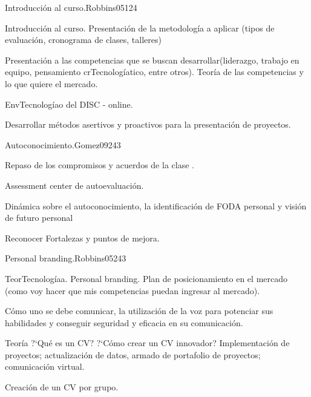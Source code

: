 \begin{syllabus}
\begin{unit}{Introducción al curso.}{}{Robbins05}{12}{4}
   \begin{topics}
      \item Introducción al curso. Presentación de la metodología a aplicar (tipos de evaluación, cronograma de clases, talleres)
      \item Presentación a las competencias que se buscan desarrollar(liderazgo, trabajo en equipo, pensamiento crTecnologíatico, entre otros). Teoría de las competencias y lo que quiere el mercado.
      \item EnvTecnologíao del DISC - online.
   \end{topics}
   \begin{learningoutcomes}
      \item Desarrollar métodos asertivos y proactivos para la presentación de proyectos.
   \end{learningoutcomes}
\end{unit}

\begin{unit}{Autoconocimiento.}{}{Gomez09}{24}{3}
   \begin{topics}
      \item Repaso de los compromisos y acuerdos de la clase .
      \item Assessment center de autoevaluación.
      \item Dinámica sobre el autoconocimiento, la identificación de FODA personal y visión de futuro personal
   \end{topics}

   \begin{learningoutcomes}
      \item Reconocer Fortalezas y puntos de mejora.
      \end{learningoutcomes}
\end{unit}

\begin{unit}{Personal branding.}{}{Robbins05}{24}{3}
   \begin{topics}
      \item TeorTecnologíaa. Personal branding. Plan de posicionamiento en el mercado (como voy hacer que mis competencias puedan ingresar al mercado).
      \item Cómo uno se debe comunicar, la utilización de la voz para potenciar sus habilidades y conseguir seguridad y eficacia en su comunicación.
      \item Teoría ?`Qué es un CV? ?`Cómo crear un CV innovador? Implementación de proyectos; actualización de datos, armado de portafolio de proyectos; comunicación virtual.
      \item Creación de un CV por grupo.
   \end{topics}


\end{unit}
\end{syllabus}
